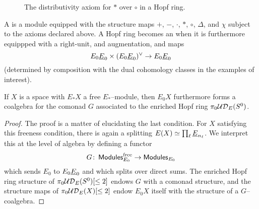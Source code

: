 \begin{figure}
\begin{center}
\end{center}
\caption{The distributivity axiom for $\ast$ over $\circ$ in a Hopf ring.}\label{DistributivityDiagram}
\end{figure}

\begin{definition}
A  is a module equipped with the structure maps $+$, $-$, $\cdot$, $\ast$, $\circ$, $\Delta$, and $\chi$ subject to the axioms declared above.  A Hopf ring becomes an  when it is furthermore equippped with a right-unit, and augmentation, and maps \[E_0 \underline{\smash{E}}_{0} \times (E_0 \underline{\smash{E}}_{0})^\vee \to E_0 \underline{\smash{E}}_{0}\] (determined by composition with the dual cohomology classes in the examples of interest).
\end{definition}

\begin{lemma}\label{HopfRingFromOneRingSpectrum}
If $X$ is a space with $E_* X$ a free $E_*$--module, then $E_0 X$ furthermore forms a coalgebra for the comonad $G$ associated to the enriched Hopf ring $\pi_0 \mathcal{UD}_E(S^0)$.
\end{lemma}
\begin{proof}
The proof is a matter of elucidating the last condition.  For $X$ satisfying this freeness condition, there is again a splitting $E(X) \simeq \prod_\ell \underline{\smash{E}}_{n_\ell}$.  We interpret this at the level of algebra by defining a functor \[G\colon\thinspace \mathsf{Modules}_{E_0}^{\mathrm{free}} \to \mathsf{Modules}_{E_0}\] which sends $E_0$ to $E_0 \underline{\smash{E}}_{0}$ and which splits over direct sums.  The enriched Hopf ring structure of $\pi_0 \mathcal{UD}_E(S^0)[\le 2]$ endows $G$ with a comonad structure, and the structure maps of $\pi_0 \mathcal{UD}_E(X)[\le 2]$ endow $E_0 X$ itself with the structure of a $G$--coalgebra.
\end{proof}

